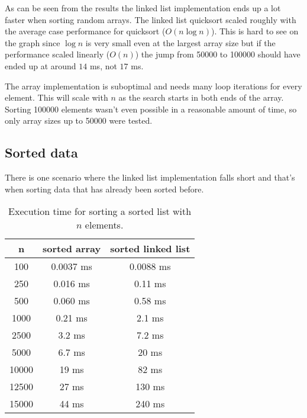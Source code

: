 \documentclass[a4paper,11pt]{article}
\begin{document}
As can be seen from the results the linked list implementation ends up a lot faster when sorting random arrays.
The linked list quicksort scaled roughly with the average case performance for quicksort ($O(n \log n)$).
This is hard to see on the graph since $\log n$ is very small even at the largest array size but if the performance scaled linearly ($O(n)$)
the jump from 50000 to 100000 should have ended up at around $14$ ms, not $17$ ms.

The array implementation is suboptimal and needs many loop iterations for every element. This will scale with $n$ as the search starts in both ends of the array.
Sorting 100000 elements wasn't even possible in a reasonable amount of time, so only array sizes up to 50000 were tested.

\subsection*{Sorted data}

There is one scenario where the linked list implementation falls short and that's when sorting data that has already been sorted before.

\begin{table}[H]
\centering
\begin{tabular}{|c|c|c|}
\hline
\textbf{n} & \textbf{sorted array} & \textbf{sorted linked list} \\
\hline
	100 & 0.0037 ms & 0.0088 ms  \\
	250 & 0.016 ms & 0.11 ms  \\
	500 & 0.060 ms & 0.58 ms  \\
	1000 & 0.21 ms & 2.1 ms  \\
	2500 & 3.2 ms & 7.2 ms  \\
	5000 & 6.7 ms & 20 ms  \\
	10000 & 19 ms & 82 ms  \\
	12500 & 27 ms & 130 ms  \\
	15000 & 44 ms & 240 ms  \\
\hline
\end{tabular}
\caption{Execution time for sorting a sorted list with $n$ elements.}
\label{tab:table2}
\end{table}

\begin{table}[H]
\centering
{}
\end{table}
\end{document}
